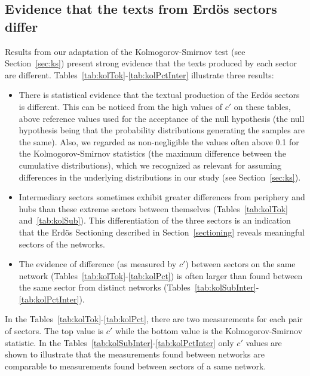 \subsection{Evidence that the texts from Erd\"os sectors differ}\label{subsec:di}
Results from our adaptation of the Kolmogorov-Smirnov test (see Section~\ref{sec:ks})
present strong evidence
that the texts produced by each sector are different.
Tables~\ref{tab:kolTok}-\ref{tab:kolPctInter}
illustrate three results:
\begin{itemize}
 \item There is statistical evidence that the textual production of the Erd\"os sectors is different.
	 This can be noticed from the high values of $c'$ on these tables, above reference values used for the acceptance of the null hypothesis (the null hypothesis being that the probability distributions generating the samples are the same). Also, we regarded as non-negligible the values often above 0.1 for the Kolmogorov-Smirnov statistics (the maximum difference between the cumulative distributions), which we recognized as relevant for assuming differences in the underlying distributions in our study (see Section~\ref{sec:ks}).
  \item Intermediary sectors sometimes exhibit greater differences 
from periphery and hubs than these extreme sectors between themselves 
(Tables~\ref{tab:kolTok} and~\ref{tab:kolSub}).
This differentiation of the three sectors is an indication that the Erd\"os Sectioning described in Section~\ref{sectioning} reveals meaningful sectors of the networks.
 \item The evidence of difference (as measured by $c'$) between sectors on the same network (Tables~\ref{tab:kolTok}-\ref{tab:kolPct}) is often larger than found between the same sector from distinct networks (Tables~\ref{tab:kolSubInter}-\ref{tab:kolPctInter}).
 \end{itemize}

 In the Tables~\ref{tab:kolTok}-\ref{tab:kolPct}, there are two measurements for each pair of sectors.
 The top value is $c'$ while the bottom value is the Kolmogorov-Smirnov statistic.
 In the Tables~\ref{tab:kolSubInter}-\ref{tab:kolPctInter} only $c'$ values are shown to illustrate
 that the measurements found between networks are comparable to measurements found between sectors of a same network.
 
 
 

 
 
 
 


